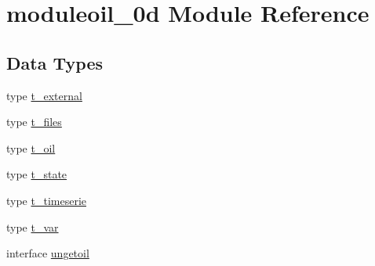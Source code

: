 \hypertarget{namespacemoduleoil__0d}{}\section{moduleoil\+\_\+0d Module Reference}
\label{namespacemoduleoil__0d}
\subsection*{Data Types}
\begin{DoxyCompactItemize}
\item 
type \mbox{\hyperlink{structmoduleoil__0d_1_1t__external}{t\+\_\+external}}
\item 
type \mbox{\hyperlink{structmoduleoil__0d_1_1t__files}{t\+\_\+files}}
\item 
type \mbox{\hyperlink{structmoduleoil__0d_1_1t__oil}{t\+\_\+oil}}
\item 
type \mbox{\hyperlink{structmoduleoil__0d_1_1t__state}{t\+\_\+state}}
\item 
type \mbox{\hyperlink{structmoduleoil__0d_1_1t__timeserie}{t\+\_\+timeserie}}
\item 
type \mbox{\hyperlink{structmoduleoil__0d_1_1t__var}{t\+\_\+var}}
\item 
interface \mbox{\hyperlink{interfacemoduleoil__0d_1_1ungetoil}{ungetoil}}
\end{DoxyCompactItemize}
